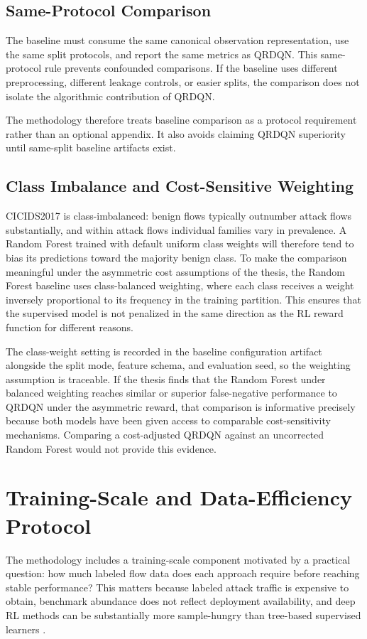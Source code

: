\subsection{Same-Protocol Comparison}
The baseline must consume the same canonical observation representation, use the same split protocols, and report the same metrics as QRDQN. This same-protocol rule prevents confounded comparisons. If the baseline uses different preprocessing, different leakage controls, or easier splits, the comparison does not isolate the algorithmic contribution of QRDQN.

The methodology therefore treats baseline comparison as a protocol requirement rather than an optional appendix. It also avoids claiming QRDQN superiority until same-split baseline artifacts exist.

\subsection{Class Imbalance and Cost-Sensitive Weighting}
CICIDS2017 is class-imbalanced: benign flows typically outnumber attack flows substantially, and within attack flows individual families vary in prevalence. A Random Forest trained with default uniform class weights will therefore tend to bias its predictions toward the majority benign class. To make the comparison meaningful under the asymmetric cost assumptions of the thesis, the Random Forest baseline uses class-balanced weighting, where each class receives a weight inversely proportional to its frequency in the training partition. This ensures that the supervised model is not penalized in the same direction as the RL reward function for different reasons.

The class-weight setting is recorded in the baseline configuration artifact alongside the split mode, feature schema, and evaluation seed, so the weighting assumption is traceable. If the thesis finds that the Random Forest under balanced weighting reaches similar or superior false-negative performance to QRDQN under the asymmetric reward, that comparison is informative precisely because both models have been given access to comparable cost-sensitivity mechanisms. Comparing a cost-adjusted QRDQN against an uncorrected Random Forest would not provide this evidence.

\section{Training-Scale and Data-Efficiency Protocol}
The methodology includes a training-scale component motivated by a practical question: how much labeled flow data does each approach require before reaching stable performance? This matters because labeled attack traffic is expensive to obtain, benchmark abundance does not reflect deployment availability, and deep RL methods can be substantially more sample-hungry than tree-based supervised learners \parencite{SuttonBarto2018RL,Ring2019DatasetSurvey}.

